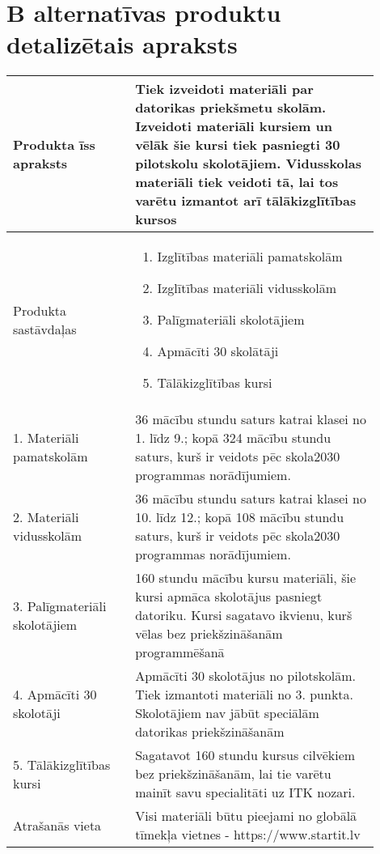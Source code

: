\section{B alternatīvas produktu detalizētais apraksts}
    \label{app:B_detalizetais_aprkasts}
    \begin{table}[!ht]
        \centering
        \begin{tabular}{|p{0.3\linewidth}|p{0.6\linewidth}|}
            \hline
            Produkta īss apraksts &
            Tiek izveidoti materiāli par datorikas priekšmetu skolām. \newline
            Izveidoti materiāli kursiem un vēlāk šie kursi tiek pasniegti 30 pilotskolu
            skolotājiem. Vidusskolas materiāli tiek veidoti tā, lai tos varētu izmantot arī
            tālākizglītības kursos
            \\
            \hline
            Produkta sastāvdaļas &
            \begin{enumerate}
                \item Izglītības materiāli pamatskolām
                \item Izglītības materiāli vidusskolām
                \item Palīgmateriāli skolotājiem
                \item Apmācīti 30 skolātāji
                \item Tālākizglītības kursi
            \end{enumerate} \\
            \hline
            1. Materiāli pamatskolām & 
            36 mācību stundu saturs katrai klasei no 1. līdz 9.; kopā 324 mācību
            stundu saturs, kurš ir veidots pēc skola2030 programmas norādījumiem.
            \\
            \hline
            2. Materiāli vidusskolām & 
            36 mācību stundu saturs katrai klasei no 10. līdz 12.; kopā 108 mācību
            stundu saturs, kurš ir veidots pēc skola2030 programmas norādījumiem.
            \\
            \hline
            3. Palīgmateriāli skolotājiem & 
            160 stundu mācību kursu materiāli, šie kursi apmāca skolotājus pasniegt
            datoriku. Kursi sagatavo ikvienu, kurš vēlas bez priekšzināšanām
            programmēšanā
            \\
            \hline
            4. Apmācīti 30 skolotāji &
            Apmācīti 30 skolotājus no pilotskolām. Tiek izmantoti materiāli no
            3. punkta. Skolotājiem nav jābūt speciālām datorikas priekšzināšanām \\
            \hline
            5. Tālākizglītības kursi & 
            Sagatavot 160 stundu kursus cilvēkiem bez priekšzināšanām, lai tie varētu
            mainīt savu specialitāti uz ITK nozari. \\
            \hline
            Atrašanās vieta & Visi materiāli būtu pieejami no globālā tīmekļa vietnes - https://www.startit.lv \\
            \hline
        \end{tabular}
    \end{table}
    \clearpage

